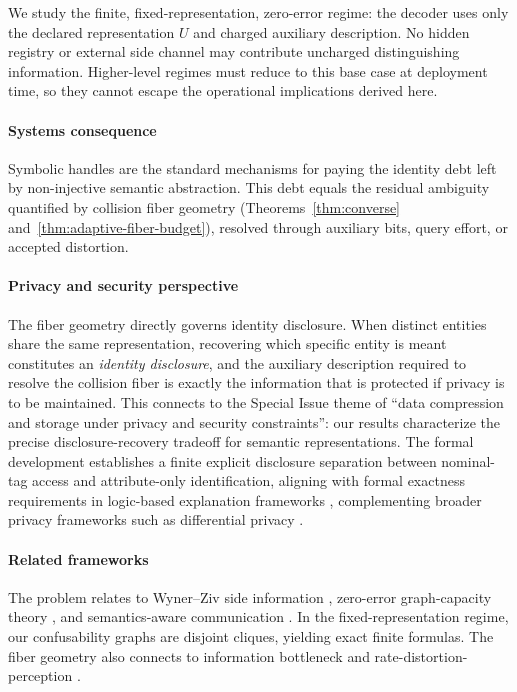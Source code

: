 We study the finite, fixed-representation, zero-error regime: the decoder uses only the declared representation $U$ and charged auxiliary description. No hidden registry or external side channel may contribute uncharged distinguishing information. Higher-level regimes must reduce to this base case at deployment time, so they cannot escape the operational implications derived here.

\paragraph{Systems consequence} Symbolic handles are the standard mechanisms for paying the identity debt left by non-injective semantic abstraction. This debt equals the residual ambiguity quantified by collision fiber geometry (Theorems~\ref*{thm:converse} and~\ref*{thm:adaptive-fiber-budget}), resolved through auxiliary bits, query effort, or accepted distortion.

\paragraph{Privacy and security perspective} The fiber geometry directly governs identity disclosure. When distinct entities share the same representation, recovering which specific entity is meant constitutes an \emph{identity disclosure}, and the auxiliary description required to resolve the collision fiber is exactly the information that is protected if privacy is to be maintained. This connects to the Special Issue theme of ``data compression and storage under privacy and security constraints'': our results characterize the precise disclosure-recovery tradeoff for semantic representations. The formal development establishes a finite explicit disclosure separation between nominal-tag access and attribute-only identification, aligning with formal exactness requirements in logic-based explanation frameworks \cite{ignatiev2019abduction, marquessilva2022trustworthy}, complementing broader privacy frameworks such as differential privacy \cite{dwork2006differential}. 

\paragraph{Related frameworks}
The problem relates to Wyner--Ziv side information \cite{slepian1973noiseless, wyner1976rate, yamamoto1981source, oohama1997gaussian, gastpar2004wyner}, zero-error graph-capacity theory \cite{shannon1956zero, lovasz1979shannon}, and semantics-aware communication \cite{gunduz2023beyond, uysal2022semantic, bao2011towards, kountouris2021semantics}. In the fixed-representation regime, our confusability graphs are disjoint cliques, yielding exact finite formulas. The fiber geometry also connects to information bottleneck \cite{Tishby2000} and rate-distortion-perception \cite{blau2019rethinking, chen2022rdp, xie2025output}.


